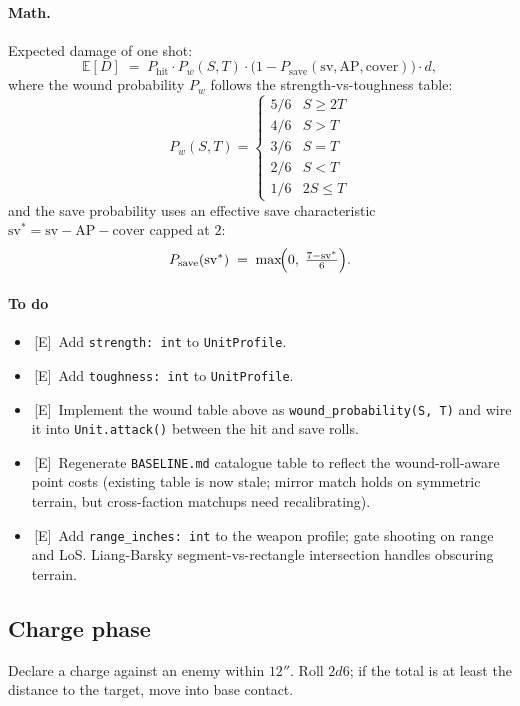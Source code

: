 \documentclass[11pt,a4paper]{article}
\newcommand{\eddie}{\textcolor{eddieblue}{\textsf{[E]}}}
\newcommand{\todo}{\ding{109}\,}    %
\newcommand{\done}{\ding{51}\,}     %
\begin{document}
\paragraph{Math.} Expected damage of one shot:
\[
  \mathbb{E}[D] \;=\; P_{\text{hit}}
  \cdot P_w(S, T)
  \cdot \bigl(1 - P_{\text{save}}(\mathrm{sv}, \mathrm{AP}, \mathrm{cover})\bigr)
  \cdot d,
\]
where the wound probability $P_w$ follows the strength-vs-toughness
table:
\[
  P_w(S, T) =
  \begin{cases}
    5/6 & S \geq 2T \\
    4/6 & S > T \\
    3/6 & S = T \\
    2/6 & S < T \\
    1/6 & 2S \leq T
  \end{cases}
\]
and the save probability uses an effective save characteristic
$\mathrm{sv}^* = \mathrm{sv} - \mathrm{AP} - \mathrm{cover}$ capped at
$2$:
\[
  P_{\text{save}}(\mathrm{sv}^*) \;=\;
  \max\!\Bigl(0,\; \tfrac{7 - \mathrm{sv}^*}{6}\Bigr).
\]

\paragraph{To do}
\begin{itemize}[label={},leftmargin=*,itemsep=2pt]
  \item \done \eddie\ Add \texttt{strength: int} to \texttt{UnitProfile}.
  \item \done \eddie\ Add \texttt{toughness: int} to \texttt{UnitProfile}.
  \item \done \eddie\ Implement the wound table above as
    \texttt{wound\_probability(S, T)} and wire it into
    \texttt{Unit.attack()} between the hit and save rolls.
  \item \todo \eddie\ Regenerate \texttt{BASELINE.md} catalogue table to
    reflect the wound-roll-aware point costs (existing table is now
    stale; mirror match holds on symmetric terrain, but cross-faction
    matchups need recalibrating).
  \item \done \eddie\ Add \texttt{range\_inches: int} to the weapon
    profile; gate shooting on range and LoS. Liang-Barsky
    segment-vs-rectangle intersection handles obscuring terrain.
\end{itemize}

\subsection{Charge phase}
Declare a charge against an enemy within $12''$. Roll $2d6$; if the
total is at least the distance to the target, move into base contact.
\end{document}
